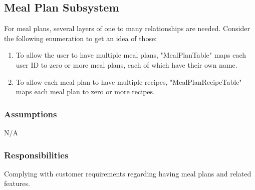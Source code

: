\subsection{Meal Plan Subsystem}\label{section:db.2}
For meal plans, several layers of one to many relationships are needed.  Consider the following enumeration to get an idea of those:
\begin{enumerate}
    \item To allow the user to have multiple meal plans, "MealPlanTable" maps each user ID to zero or more meal plans, each of which have their own name.
    \item To allow each meal plan to have multiple recipes, "MealPlanRecipeTable" maps each meal plan to zero or more recipes.
\end{enumerate}


\subsubsection{Assumptions}
N/A

\subsubsection{Responsibilities}
Complying with customer requirements regarding having meal plans and related features.

